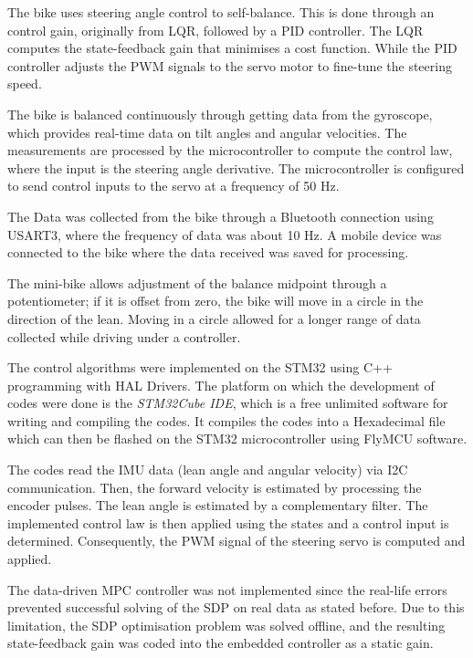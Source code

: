 
The bike uses steering angle control to self-balance. This is done through an control gain, originally from LQR, followed by a PID controller. The LQR computes the state-feedback gain that minimises a cost function. While the PID controller adjusts the PWM signals to the servo motor to fine-tune the steering speed.

The bike is balanced continuously through getting data from the gyroscope, which provides real-time data on tilt angles and angular velocities. The measurements are processed by the microcontroller to compute the control law, where the input is the steering angle derivative. The microcontroller is configured to send control inputs to the servo at a frequency of 50 Hz.

The Data was collected from the bike through a Bluetooth connection using USART3, where the frequency of data was about 10 Hz. A mobile device was connected to the bike where the data received was saved for processing.

The mini-bike allows adjustment of the balance midpoint through a potentiometer; if it is offset from zero, the bike will move in a circle in the direction of the lean. Moving in a circle allowed for a longer range of data collected while driving under a controller.

The control algorithms were implemented on the STM32 using C++ programming with HAL Drivers.
The platform on which the development of codes were done is the \textit{STM32Cube IDE}, which is a free unlimited software for writing and compiling the codes. It compiles the codes into a Hexadecimal file which can then be flashed on the STM32 microcontroller using FlyMCU software.

The codes read the IMU data (lean angle and angular velocity) via I2C communication. Then, the forward velocity is estimated by processing the encoder pulses. The lean angle is estimated by a complementary filter. The implemented control law is then applied using the states and a control input is determined. Consequently, the PWM signal of the steering servo is computed and applied.

The data-driven MPC controller was not implemented since the real-life errors prevented successful solving of the SDP on real data as stated before. Due to this limitation, the SDP optimisation problem was solved offline, and the resulting state-feedback gain was coded into the embedded controller as a static gain.

